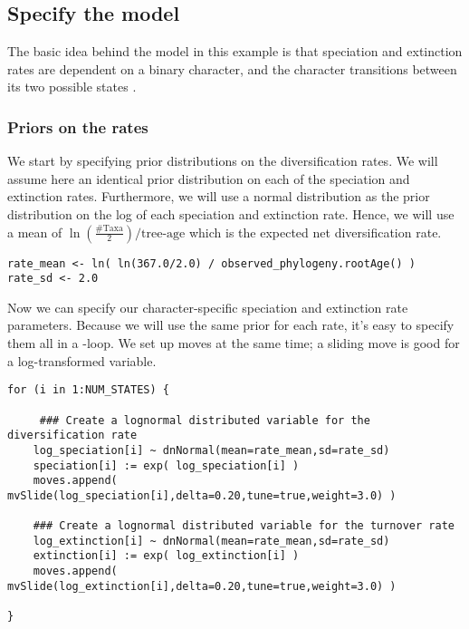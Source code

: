 \subsection{Specify the model}

The basic idea behind the model in this example is that speciation and extinction rates are dependent on a binary character, and the character transitions between its two possible states \citep{Maddison2007}.

\subsubsection{Priors on the rates}

We start by specifying prior distributions on the diversification rates.
We will assume here an identical prior distribution on each of the speciation and extinction rates.
Furthermore, we will use a normal distribution as the prior distribution on the log of each speciation and extinction rate.
Hence, we will use a mean of $\ln(\frac{\text{\#Taxa}}{2}) / \text{tree-age}$ which is the expected net diversification rate.
{\tt \begin{snugshade*}
\begin{lstlisting}
rate_mean <- ln( ln(367.0/2.0) / observed_phylogeny.rootAge() )
rate_sd <- 2.0
\end{lstlisting}
\end{snugshade*}}
Now we can specify our character-specific speciation and extinction rate parameters.
Because we will use the same prior for each rate, it's easy to specify them all in a -loop.
We set up moves at the same time; a sliding move is good for a log-transformed variable.
{\tt \begin{snugshade*}
\begin{lstlisting}
for (i in 1:NUM_STATES) {
    
     ### Create a lognormal distributed variable for the diversification rate
    log_speciation[i] ~ dnNormal(mean=rate_mean,sd=rate_sd) 
    speciation[i] := exp( log_speciation[i] )
    moves.append( mvSlide(log_speciation[i],delta=0.20,tune=true,weight=3.0) )

    ### Create a lognormal distributed variable for the turnover rate
    log_extinction[i] ~ dnNormal(mean=rate_mean,sd=rate_sd) 
    extinction[i] := exp( log_extinction[i] )
    moves.append( mvSlide(log_extinction[i],delta=0.20,tune=true,weight=3.0) )

}
\end{lstlisting}
\end{snugshade*}}

